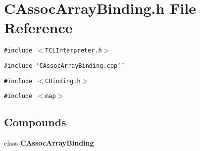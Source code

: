 \section{CAssoc\-Array\-Binding.h File Reference}
\label{CAssocArrayBinding_8h}
{\tt \#include $<$TCLInterpreter.h$>$}\par
{\tt \#include \char`\"{}CAssoc\-Array\-Binding.cpp\char`\"{}}\par
{\tt \#include $<$CBinding.h$>$}\par
{\tt \#include $<$map$>$}\par
\subsection*{Compounds}
\begin{CompactItemize}
\item 
class {\bf CAssoc\-Array\-Binding}
\end{CompactItemize}
